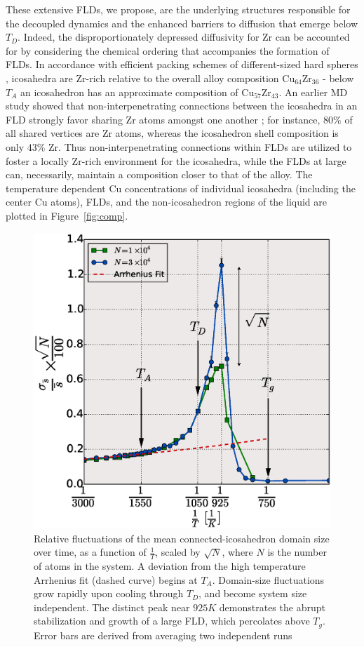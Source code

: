 \documentclass[aps,prl,preprint,showpacs,amsmath,floatfix,superscriptaddress]{revtex4}
\begin{document}
These extensive FLDs, we propose, are the underlying structures
responsible for the decoupled dynamics and the enhanced barriers
to diffusion that emerge below $T_{D}$. Indeed, the
disproportionately depressed diffusivity for Zr can be accounted
for by considering the chemical ordering that accompanies the
formation of FLDs. In accordance with efficient packing schemes of
different-sized hard spheres \cite{Sheng2006,Miracle2003},
icosahedra are Zr-rich relative to the overall alloy composition
Cu$_{64}$Zr$_{36}$ - below $T_{A}$ an icosahedron has an
approximate composition of Cu$_{57}$Zr$_{43}$. An earlier MD study
showed that non-interpenetrating connections between the
icosahedra in an FLD strongly favor sharing Zr atoms amongst one
another \cite{Soklaski2013}; for instance, $80\%$ of all shared
vertices are Zr atoms, whereas the icosahedron shell composition
is only $43\%$ Zr. Thus non-interpenetrating connections within
FLDs are utilized to foster a locally Zr-rich environment for the
icosahedra, while the FLDs at large can, necessarily, maintain a
composition closer to that of the alloy. The temperature dependent
Cu concentrations of individual icosahedra (including the center
Cu atoms), FLDs, and the non-icosahedron regions of the liquid are
plotted in Figure~\ref{fig:comp}.

\begin{figure}[t]
\includegraphics[scale=0.38]{Thesis_net_fluc.eps}
\caption{Relative fluctuations of the mean connected-icosahedron
domain size over time, as a function of $\frac{1}{T}$, scaled by
$\sqrt{N}$, where $N$ is the number of atoms in the system. A deviation
from the high temperature Arrhenius fit (dashed curve) begins at
$T_{A}$. Domain-size fluctuations grow rapidly upon cooling
through $T_{D}$, and become system size independent. The distinct peak near $925K$
demonstrates the abrupt stabilization and growth of a large FLD,
which percolates above $T_{g}$. Error bars are derived from
averaging two independent runs} \label{fig:netflucs}
\end{figure}
\end{document}
